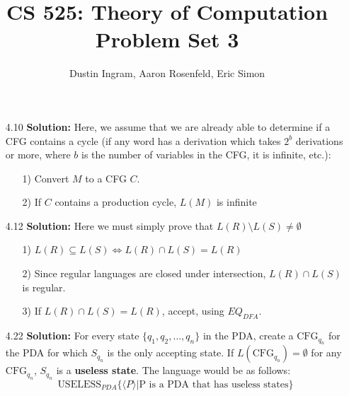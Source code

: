\documentclass{article}
\title{CS 525: Theory of Computation\\ Problem Set 3}
\author{Dustin Ingram, Aaron Rosenfeld, Eric Simon}
\begin{document}
\maketitle
\begin{enumerate}
    \item[4.10] \textbf{Solution:}
    Here, we assume that we are already able to determine if a CFG contains a cycle (if any word has a derivation which takes $2^{b}$ derivations or more, where $b$ is the number of variables in the CFG, it is infinite, etc.):
    \begin{enumerate}
        \item[1)] Convert $M$ to a CFG $C$. 
        \item[2)] If $C$ contains a production cycle, $L(M)$ is infinite
    \end{enumerate}
    \item[4.12] \textbf{Solution:}
    Here we must simply prove that $L(R)\setminus L(S)\neq\emptyset$
    \begin{enumerate}
        \item[1)] $L(R)\subseteq L(S) \Leftrightarrow L(R) \cap L(S) = L(R)$ 
        \item[2)] Since regular languages are closed under intersection, $L(R) \cap L(S)$ is regular.
        \item[3)] If $L(R) \cap L(S) = L(R)$, accept, using $EQ_{DFA}$.
    \end{enumerate}
    \item[4.22] \textbf{Solution:}
    For every state $\{q_{1}, q_{2}, \dots, q_{n}\}$ in the PDA, create a $\text{CFG}_{q_{n}}$ for the PDA for which $S_{q_{n}}$ is the only accepting state. If $L(\text{CFG}_{q_{n}})=\emptyset$ for any $\text{CFG}_{q_{n}}$, $S_{q_{n}}$ is a \textbf{useless state}. The language would be as follows:
    $$ \text{USELESS}_{PDA}\{\langle P \rangle |  \text{P is a PDA that has useless states}\} $$ 
\end{enumerate}
\end{document}
